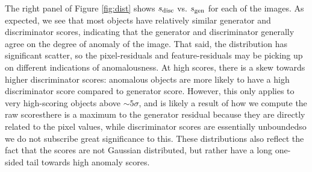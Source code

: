The right panel of Figure \ref{fig:dist} shows $s_\mathrm{disc}$ vs.  $s_\mathrm{gen}$ for each of the images.
As expected, we see that most objects have relatively similar generator and discriminator scores, indicating that the generator and discriminator generally agree on the degree of anomaly of the image.
That said, the distribution has significant scatter, so the pixel-residuals and feature-residuals may be picking up on different indications of anomalousness.
At high scores, there is a skew towards higher discriminator scores: anomalous objects are more likely to have a high discriminator score compared to generator score.
However, this only applies to very high-scoring objects above $\sim5\sigma$, and is likely a result of how we compute the raw scores{\emdash}there is a maximum to the generator residual because they are directly related to the pixel values, while discriminator scores are essentially unbounded{\emdash}so we do not subscribe great significance to this.
These distributions also reflect the fact that the scores are not Gaussian distributed, but rather have a long one-sided tail towards high anomaly scores.


